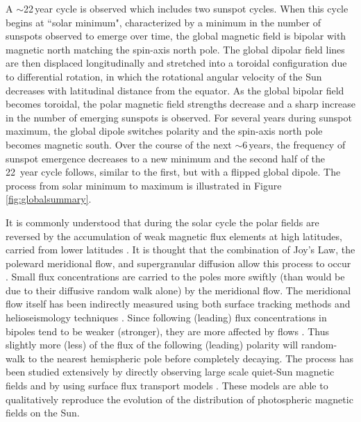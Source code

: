 A $\sim$22\,year cycle is observed which includes two sunspot cycles. When this cycle begins at ``solar minimum", characterized by a minimum in the number of sunspots observed to emerge over time,  the global magnetic field is bipolar with magnetic north matching the spin-axis north pole. The global dipolar field lines are then displaced longitudinally and stretched into a toroidal configuration due to differential rotation, in which the rotational angular velocity of the Sun decreases with latitudinal distance from the equator. As the global bipolar field becomes toroidal, the polar magnetic field strengths decrease and a sharp increase in the number of emerging sunspots is observed. For several years during sunspot maximum, the global dipole switches polarity and the spin-axis north pole becomes magnetic south. Over the course of the next $\sim$6\,years, the frequency of sunspot emergence decreases to a new minimum and the second half of the 22~year cycle follows, similar to the first, but with a flipped global dipole. The process from solar minimum to maximum is illustrated in Figure\,\ref{fig:globalsummary}.

It is commonly understood that during the solar cycle the polar fields are reversed by the accumulation of weak magnetic flux elements at high latitudes, carried from lower latitudes \citep{Babcock:1961, Leighton:1964}. It is thought that the combination of Joy's Law, the poleward meridional flow, and supergranular diffusion allow this process to occur \citep{Mosher:1977}. Small flux concentrations are carried to the poles more swiftly (than would be due to their diffusive random walk alone) by the meridional flow. The meridional flow itself has been indirectly measured using both surface tracking methods and helioseismology techniques \citep{Hathaway:2010,Haber:2002,Zhao:2004}. Since following (leading) flux concentrations in bipoles tend to be weaker (stronger), they are more affected by flows \citep{Schrijver:1996}. Thus slightly more (less) of the flux of the following (leading) polarity will random-walk to the nearest hemispheric pole before completely decaying. The process has been studied extensively by directly observing large scale quiet-Sun magnetic fields \citep{Harvey:1992,Ulrich:2005,Schrijver:2008b} and by using surface flux transport models \citep{Leighton:1964,Wang:1989,Schrijver:2003}. These models are able to qualitatively reproduce the evolution of the distribution of photospheric magnetic fields on the Sun. 

